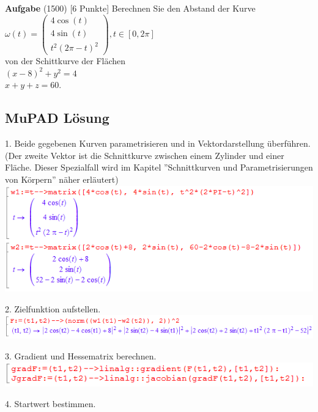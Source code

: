 \documentclass[11pt,final]{scrreprt}
\newcommand{\br} {\medskip\\}
\begin{document}
\textbf{Aufgabe} (1500) [6 Punkte] Berechnen Sie den Abstand der Kurve\br
$ \omega(t)=\left(\begin{matrix}
4\cos(t)\\ 
4\sin(t)\\ 
t^2(2\pi-t)^2
\end{matrix}\right), t\in[0, 2\pi] $\br
von der Schittkurve der Flächen\\

$ (x-8)^2+y^2=4 $\\
$ x+y+z = 60 $.\\

\subsection{MuPAD Lösung}

1. Beide gegebenen Kurven parametrisieren und in Vektordarstellung überführen.\\
(Der zweite Vektor ist die Schnittkurve zwischen einem Zylinder und einer Fläche. Dieser Spezialfall wird im Kapitel ''Schnittkurven und Parametrisierungen von Körpern'' näher erläutert)\\

\includegraphics[scale=2.2]{images/abstandsproblem/param.png}

2. Zielfunktion aufstellen.\\

\includegraphics[scale=2.2]{images/abstandsproblem/zielfkt.png}

3. Gradient und Hessematrix berechnen.\\

\includegraphics[scale=2.2]{images/abstandsproblem/grad.png}

4. Startwert bestimmen.\\
\end{document}
